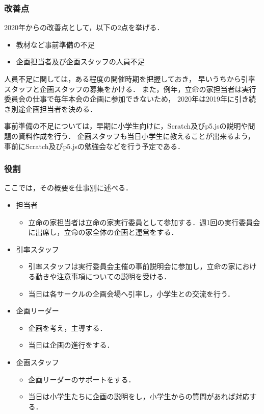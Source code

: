 \subsubsection*{改善点}

2020年からの改善点として，以下の2点を挙げる．

\begin {itemize}
    \item 教材など事前準備の不足
    \item 企画担当者及び企画スタッフの人員不足
\end {itemize}

人員不足に関しては，ある程度の開催時期を把握しておき，
早いうちから引率スタッフと企画スタッフの募集をかける．
また，例年，立命の家担当者は実行委員会の仕事で毎年本会の企画に参加できないため，
2020年は2019年に引き続き別途企画担当者を決める．

事前準備の不足については，早期に小学生向けに，Scratch及びp5.jsの説明や問題の資料作成を行う．
企画スタッフも当日小学生に教えることが出来るよう，事前にScratch及びp5.jsの勉強会などを行う予定である．

\subsubsection*{役割}

ここでは，その概要を仕事別に述べる．

\begin{itemize}
 \item 担当者
  \begin{itemize}
  \item 立命の家担当者は立命の家実行委員として参加する．週1回の実行委員会に出席し，立命の家全体の企画と運営をする．
  \end{itemize}
 \item 引率スタッフ
　\begin{itemize}
  \item 引率スタッフは実行委員会主催の事前説明会に参加し，立命の家における動きや注意事項についての説明を受ける．
  \item 当日は各サークルの企画会場へ引率し，小学生との交流を行う．
  \end{itemize}
 \item 企画リーダー
  \begin{itemize}
  \item 企画を考え，主導する．
  \item 当日は企画の進行をする．
  \end{itemize}
 \item 企画スタッフ
  \begin{itemize}
  \item 企画リーダーのサポートをする．
  \item 当日は小学生たちに企画の説明をし，小学生からの質問があれば対応する．
  \end{itemize}
\end{itemize}
